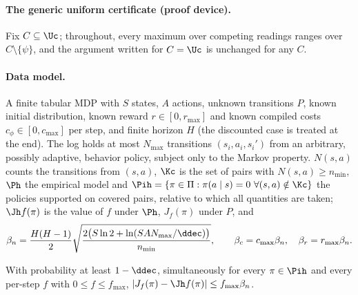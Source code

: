 \paragraph{The generic uniform certificate (proof device).}
Fix $C\subseteq\Uc$; throughout, every maximum over competing readings
ranges over $C\setminus\{\psi\}$, and the argument written for $C=\Uc$ is
unchanged for any $C$.

\paragraph{Data model.} A finite tabular MDP with $S$ states, $A$ actions, unknown
transitions $P$, known initial distribution, known reward $r\in[0,r_{\max}]$ and known
compiled costs $c_\phi\in[0,c_{\max}]$ per step, and finite horizon $H$ (the discounted case
is treated at the end). The log holds at most $N_{\max}$ transitions $(s_i,a_i,s_i')$ from an
arbitrary, possibly adaptive, behavior policy, subject only to the Markov property. $N(s,a)$
counts the transitions from $(s,a)$, $\Kc$ is the set of pairs with $N(s,a)\ge n_{\min}$,
$\Ph$ the empirical model and $\Pih=\{\pi\in\Pi:\pi(a\mid s)=0\ \forall(s,a)\notin\Kc\}$ the
policies supported on covered pairs, relative to which all quantities are taken; $\Jh f(\pi)$
is the value of $f$ under $\Ph$, $J_f(\pi)$ under $P$, and
\[
\beta_n=\frac{H(H-1)}{2}\sqrt{\frac{2\big(S\ln2+\ln(SAN_{\max}/\ddec)\big)}{n_{\min}}},
\qquad \beta_c=c_{\max}\beta_n,\quad\beta_r=r_{\max}\beta_n .
\]
\begin{lemma}
\label{lem:uniform}
With probability at least $1-\ddec$, simultaneously for every $\pi\in\Pih$
and every per-step $f$ with $0\le f\le f_{\max}$,
$|J_f(\pi)-\Jh f(\pi)|\le f_{\max}\beta_n$.
\end{lemma}
